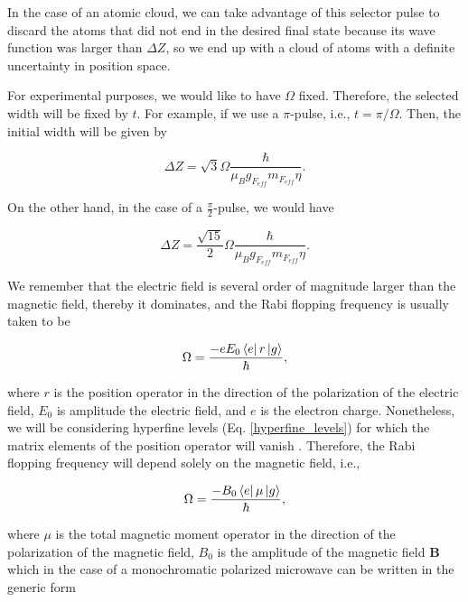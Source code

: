 \documentclass{article}
\begin{document}
In the case of an atomic cloud, we can take advantage of this selector pulse to discard the atoms that did not end in the desired final state because its wave function was larger than $\Delta Z$, so we end up with a cloud of atoms with a definite uncertainty in position space.

For experimental purposes, we would like to have $\Omega$ fixed. Therefore, the selected width will be fixed by $t$. For example, if we use a $\pi$-pulse, i.e., $t=\pi/\Omega$. Then, the initial width will be given by

\begin{equation}\label{initial_width}
\Delta Z = \sqrt{3} \Omega \frac{\hbar}{\mu_{B} g_{F_{eff}} m_{F_{eff}} \eta}.
\end{equation}

On the other hand, in the case of a $\frac{\pi}{2}$-pulse, we would have

\begin{equation}\label{initial_width_pi/2}
\Delta Z = \frac{\sqrt{15}}{2} \Omega \frac{\hbar}{\mu_{B} g_{F_{eff}} m_{F_{eff}} \eta}.
\end{equation}

We remember that the electric field is several order of magnitude larger than the magnetic field, thereby it dominates, and the Rabi flopping frequency is usually taken to be

\begin{equation*}
\Omega = \frac{- e E_{0} \bra{e} r \ket{g}}{\hbar},
\end{equation*}

where $r$ is the position operator in the direction of the polarization of the electric field, $E_{0}$ is amplitude the electric field, and $e$ is the electron charge. Nonetheless, we will be considering hyperfine levels (Eq. \ref{hyperfine_levels}) for which the matrix elements of the position operator will vanish  \cite{Steck2010}. Therefore, the Rabi flopping frequency will depend solely on the magnetic field, i.e.,

\begin{equation}\label{rabi_frequency_magnetic_field}
\Omega = \frac{- B_{0} \bra{e} \mu \ket{g}}{\hbar},
\end{equation}

where $\mu$ is the total magnetic moment operator in the direction of the polarization of the magnetic field, $B_{0}$ is the amplitude of the magnetic field $\textbf{B}$ which in the case of a monochromatic polarized microwave can be written in the generic form
\end{document}
